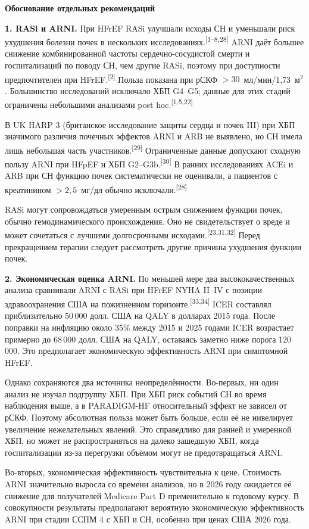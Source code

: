 \documentclass[11pt,a4paper]{article}
\newcommand{\src}[1]{\textsuperscript{[#1]}}
\newcommand{\heading}[1]{\par\medskip\textbf{#1}\par}
\newcommand{\unitgfr}{мл/мин/1,73~м$^2$}
\begin{document}
\heading{Обоснование отдельных рекомендаций}
\textbf{1. RASi и ARNI.} При HFrEF RASi улучшали исходы СН и уменьшали риск ухудшения болезни почек в нескольких исследованиях.\src{1--8,28} ARNI даёт большее снижение комбинированной частоты сердечно-сосудистой смерти и госпитализаций по поводу СН, чем другие RASi, поэтому при доступности предпочтителен при HFrEF.\src{2} Польза показана при рСКФ $>30$~\unitgfr. Большинство исследований исключало ХБП G4--G5; данные для этих стадий ограничены небольшими анализами post hoc.\src{1,5,22}

В UK HARP 3 (британское исследование защиты сердца и почек III) при ХБП значимого различия почечных эффектов ARNI и ARB не выявлено, но СН имела лишь небольшая часть участников.\src{29} Ограниченные данные допускают сходную пользу ARNI при HFpEF и ХБП G2--G3b.\src{30} В ранних исследованиях ACEi и ARB при СН функцию почек систематически не оценивали, а пациентов с креатинином $>2{,}5$~мг/дл обычно исключали.\src{28}

RASi могут сопровождаться умеренным острым снижением функции почек, обычно гемодинамического происхождения. Оно не свидетельствует о вреде и может сочетаться с лучшими долгосрочными исходами.\src{23,31,32} Перед прекращением терапии следует рассмотреть другие причины ухудшения функции почек.

\textbf{2. Экономическая оценка ARNI.} По меньшей мере два высококачественных анализа сравнивали ARNI с RASi при HFrEF NYHA II--IV с позиции здравоохранения США на пожизненном горизонте.\src{33,34} ICER составлял приблизительно 50\,000 долл. США на QALY в долларах 2015 года. После поправки на инфляцию около 35\% между 2015 и 2025 годами ICER возрастает примерно до 68\,000 долл. США на QALY, оставаясь заметно ниже порога 120\,000. Это предполагает экономическую эффективность ARNI при симптомной HFrEF.

Однако сохраняются два источника неопределённости. Во-первых, ни один анализ не изучал подгруппу ХБП. При ХБП риск событий СН во время наблюдения выше, а в PARADIGM-HF относительный эффект не зависел от рСКФ. Поэтому абсолютная польза может быть больше, если её не нивелирует увеличение нежелательных явлений. Это справедливо для ранней и умеренной ХБП, но может не распространяться на далеко зашедшую ХБП, когда госпитализации из-за перегрузки объёмом могут не предотвращаться ARNI.

Во-вторых, экономическая эффективность чувствительна к цене. Стоимость ARNI значительно выросла со времени анализов, но в 2026 году ожидается её снижение для получателей Medicare Part D применительно к годовому курсу. В совокупности результаты предполагают вероятную экономическую эффективность ARNI при стадии ССПМ 4 с ХБП и СН, особенно при ценах США 2026 года.
\end{document}
